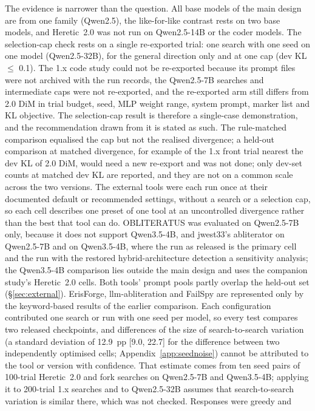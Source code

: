 The evidence is narrower than the question. All base models of the main design are from one family (Qwen2.5), the
like-for-like contrast rests on two base models, and Heretic~2.0 was not run on Qwen2.5-14B or the coder models. The
selection-cap check rests on a single re-exported trial: one search with one seed on one model (Qwen2.5-32B), for the
general direction only and at one cap (dev KL $\le$ 0.1). The 1.x code study could not be re-exported because its
prompt files were not archived with the run records, the Qwen2.5-7B searches and intermediate caps were not re-exported, and the
re-exported arm still differs from 2.0 DiM in trial budget, seed, MLP weight range, system prompt, marker list and KL
objective. The selection-cap result is therefore a single-case demonstration, and the recommendation drawn from it is
stated as such. The rule-matched comparison equalised the cap but not the realised divergence; a held-out comparison at
matched divergence, for example of the 1.x front trial nearest the dev KL of 2.0 DiM, would need a new re-export and was
not done; only dev-set counts at matched dev KL are reported, and they are not on a common scale across the two
versions. The
external tools were each run once at their documented default or recommended settings, without a search or a
selection cap, so each cell describes one preset of one tool at an uncontrolled divergence rather than the best that
tool can do. OBLITERATUS was evaluated on Qwen2.5-7B only, because it does not support Qwen3.5-4B, and jwest33's
abliterator on Qwen2.5-7B and on Qwen3.5-4B, where the run as released is the primary cell and the run with the
restored hybrid-architecture detection a sensitivity analysis; the Qwen3.5-4B comparison lies outside the main
design and uses the companion study's Heretic~2.0 cells. Both tools' prompt pools partly overlap the held-out set
(\S\ref{sec:external}). ErisForge, llm-abliteration and FailSpy are represented only by the keyword-based results of
the earlier comparison. Each configuration contributed one search or run with one seed per model, so every test
compares two released checkpoints, and differences of the size of search-to-search variation (a standard deviation
of 12.9~pp [9.0, 22.7] for the difference between two independently optimised cells; Appendix~\ref{app:seednoise})
cannot be attributed to the tool or version with confidence. That estimate comes from ten seed pairs of 100-trial
Heretic~2.0 and fork searches on Qwen2.5-7B and Qwen3.5-4B; applying it to 200-trial 1.x searches and to Qwen2.5-32B
assumes that search-to-search variation is similar there, which was not checked. Responses were greedy and
